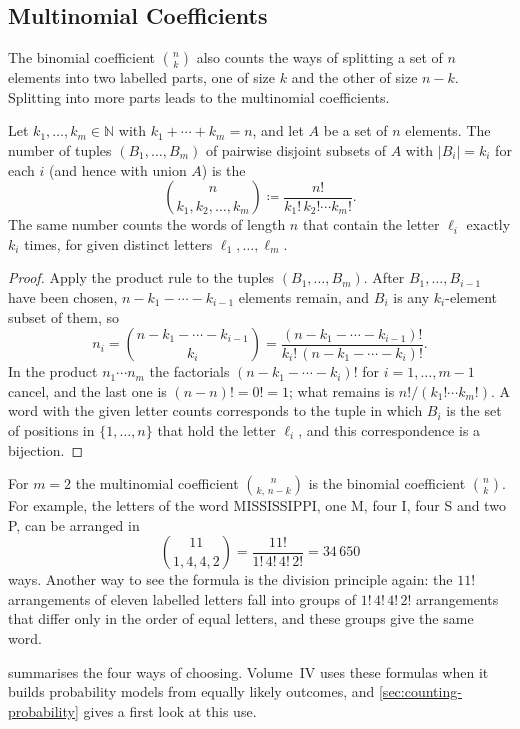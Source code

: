 \subsection{Multinomial Coefficients}

The binomial coefficient $\binom nk$ also counts the ways of splitting a set of $n$ elements into two labelled parts, one of size $k$ and the other of size $n-k$. Splitting into more parts leads to the multinomial coefficients.

\begin{theorem}
\label{thm:multinomial}
Let $k_1,\ldots,k_m\in\mathbb N$ with $k_1+\cdots+k_m=n$, and let $A$ be a set of $n$ elements. The number of tuples $(B_1,\ldots,B_m)$ of pairwise disjoint subsets of $A$ with $|B_i|=k_i$ for each $i$ (and hence with union $A$) is the 
\[
\binom{n}{k_1,k_2,\ldots,k_m}\coloneqq\frac{n!}{k_1!\,k_2!\cdots k_m!}.
\]
The same number counts the words of length $n$ that contain the letter $\ell_i$ exactly $k_i$ times, for given distinct letters $\ell_1,\ldots,\ell_m$.
\end{theorem}

\begin{proof}
Apply the product rule to the tuples $(B_1,\ldots,B_m)$. After $B_1,\ldots,B_{i-1}$ have been chosen, $n-k_1-\cdots-k_{i-1}$ elements remain, and $B_i$ is any $k_i$-element subset of them, so
\[
n_i=\binom{n-k_1-\cdots-k_{i-1}}{k_i}=\frac{(n-k_1-\cdots-k_{i-1})!}{k_i!\,(n-k_1-\cdots-k_i)!}.
\]
In the product $n_1\cdots n_m$ the factorials $(n-k_1-\cdots-k_i)!$ for $i=1,\ldots,m-1$ cancel, and the last one is $(n-n)!=0!=1$; what remains is $n!/(k_1!\cdots k_m!)$. A word with the given letter counts corresponds to the tuple in which $B_i$ is the set of positions in $\{1,\ldots,n\}$ that hold the letter $\ell_i$, and this correspondence is a bijection.
\end{proof}

For $m=2$ the multinomial coefficient $\binom{n}{k,\,n-k}$ is the binomial coefficient $\binom nk$. For example, the letters of the word MISSISSIPPI, one M, four I, four S and two P, can be arranged in
\[
\binom{11}{1,4,4,2}=\frac{11!}{1!\,4!\,4!\,2!}=34\,650
\]
ways. Another way to see the formula is the division principle again: the $11!$ arrangements of eleven labelled letters fall into groups of $1!\,4!\,4!\,2!$ arrangements that differ only in the order of equal letters, and these groups give the same word.

 summarises the four ways of choosing. Volume~IV uses these formulas when it builds probability models from equally likely outcomes, and \cref{sec:counting-probability} gives a first look at this use.

